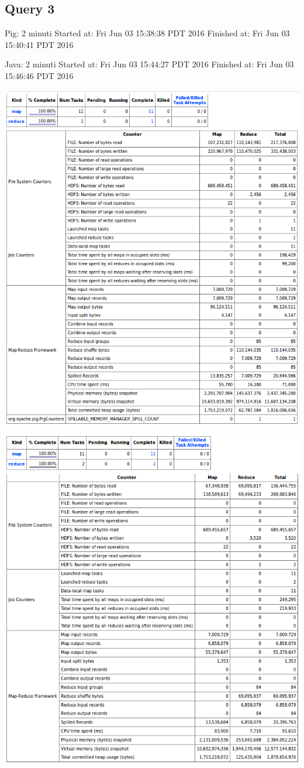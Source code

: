 \documentclass[11pt]{article} %
\begin{document}
\subsection{Query 3}
Pig: 2 minuti	 Started at: Fri Jun 03 15:38:38 PDT 2016	 Finished at: Fri Jun 03 15:40:41 PDT 2016

Java: 2 minuti	 Started at: Fri Jun 03 15:44:27 PDT 2016	 Finished at: Fri Jun 03 15:46:46 PDT 2016

\includegraphics[scale=0.8]{pig3.png}

\includegraphics[scale=0.8]{java3.png}
\end{document}
